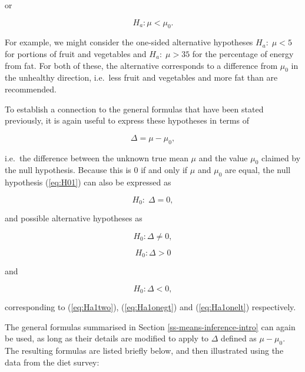 \documentclass[11pt,a4paper,openany]{book}
\begin{document}
or

\begin{equation}H_{a}:  \mu< \mu_{0}.\label{eq:Ha1onelt}\end{equation}

For example, we might consider the one-sided alternative hypotheses
\(H_{a}:\; \mu<5\) for portions of fruit and vegetables and
\(H_{a}:\;\mu>35\) for the percentage of energy from fat. For both of
these, the alternative corresponds to a difference from \(\mu_{0}\) in
the unhealthy direction, i.e.~less fruit and vegetables and more fat
than are recommended.

To establish a connection to the general formulas that have been stated
previously, it is again useful to express these hypotheses in terms of

\begin{equation}\Delta=\mu-\mu_{0},\label{eq:D1mu}\end{equation}

i.e.~the difference between the unknown true mean \(\mu\) and the value
\(\mu_{0}\) claimed by the null hypothesis. Because this is 0 if and
only if \(\mu\) and \(\mu_{0}\) are equal, the null hypothesis
(\ref{eq:H01}) can also be expressed as

\begin{equation}H_{0}: \; \Delta=0,\label{eq:H0D}\end{equation}

and possible alternative hypotheses as

\begin{equation}H_{0}: \Delta\ne0, \label{eq:HaDtwo}\end{equation}

\begin{equation}H_{0}: \Delta>0 \label{eq:HaDonegt}\end{equation}

and

\begin{equation}H_{0}:  \Delta< 0,   \label{eq:HaDonelt}\end{equation}

corresponding to (\ref{eq:Ha1two}), (\ref{eq:Ha1onegt}) and
(\ref{eq:Ha1onelt}) respectively.

The general formulas summarised in Section
\ref{ss-means-inference-intro} can again be used, as long as their
details are modified to apply to \(\Delta\) defined as \(\mu-\mu_{0}\).
The resulting formulas are listed briefly below, and then illustrated
using the data from the diet survey:
\end{document}
